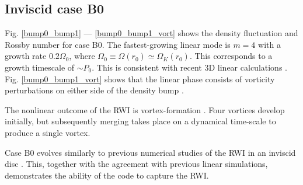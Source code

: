 \subsection{Inviscid case B0}
Fig. \ref{bump0_bump1} --- \ref{bump0_bump1_vort}
shows the density fluctuation and Rossby number for
case B0. The fastest-growing linear mode is $m=4$ with a growth rate
$0.2\Omega_0$, where $\Omega_0\equiv\Omega(r_0)\simeq\Omega_K(r_0)$. This
corresponds to a growth timescale of $\sim P_0$. 
This is consistent with recent 3D linear calculations
\citep{meheut12,lin13}. Fig. \ref{bump0_bump1_vort} shows that the
linear phase consists of vorticity perturbations on either side of
the density bump \citep{umurhan10}. 

The nonlinear outcome of the RWI is vortex-formation
\citep{li00}. Four vortices develop initially, but 
subsequently merging takes place on a dynamical time-scale to produce
a single vortex. %

Case B0 evolves similarly to previous numerical  
studies of the RWI in an inviscid disc
\citep[e.g.][where a more detailed discussion is
given]{meheut10,meheut12b}. This, together with the agreement with
previous linear simulations, demonstrates the ability of the \pluto
code to capture the RWI. 

